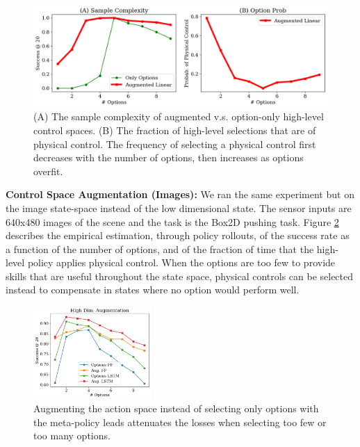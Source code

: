 \begin{figure}[ht!]\vspace{-2em}
    \centering
    \includegraphics[width=\textwidth]{ddco-experiments/exp1-3.png}
    \caption{ (A) The sample complexity of augmented v.s. option-only high-level control spaces. (B) The fraction of high-level selections that are of physical control. The frequency of selecting a physical control first decreases with the number of options, then increases as options overfit. \label{fig:b2dexp1-3}}
\end{figure}


\vspace{0.25em}\noindent\textbf{Control Space Augmentation (Images): }  We ran the same experiment but on the image state-space instead of the low dimensional state.
The sensor inputs are 640x480 images of the scene and the task is the Box2D pushing task.
Figure \ref{fig:augimages} describes the empirical estimation, through policy rollouts, of the success rate as a function of the number of options, and of the fraction of time that the high-level policy applies physical control.
When the options are too few to provide skills that are useful throughout the state space, physical controls can be selected instead to compensate in states where no option would perform well. 

\begin{figure} [ht!]
\centering
    \includegraphics[width=0.4\textwidth]{ddco-experiments/exp7-1.png}
    \caption{Augmenting the action space instead of selecting only options with the meta-policy leads attenuates the losses when selecting too few or too many options. \label{fig:augimages}}
\end{figure}


